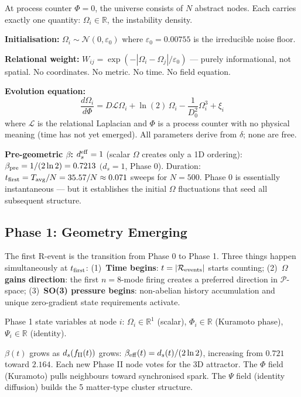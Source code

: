 \documentclass[12pt, a4paper]{article}
\begin{document}
\begin{formalbox}[title={Phase 0 --- Pre-Geometric State}]
At process counter $\Phi = 0$, the universe consists of $N$ abstract nodes. Each carries
exactly one quantity: $\Omega_i \in \mathbb{R}$, the instability density.

\textbf{Initialisation:} $\Omega_i \sim \mathcal{N}(0,\varepsilon_0)$ where
$\varepsilon_0 = 0.00755$ is the irreducible noise floor.

\textbf{Relational weight:} $W_{ij} = \exp(-|\Omega_i - \Omega_j|/\varepsilon_0)$ ---
purely informational, not spatial. No coordinates. No metric. No time. No field equation.

\textbf{Evolution equation:}
\[
  \frac{d\Omega_i}{d\Phi} = D\mathcal{L}\Omega_i + \ln(2)\,\Omega_i
  - \frac{1}{D_0^2}\Omega_i^3 + \xi_i
\]
where $\mathcal{L}$ is the relational Laplacian and $\Phi$ is a process counter
with no physical meaning (time has not yet emerged). All parameters derive from $\delta$;
none are free.

\textbf{Pre-geometric $\beta$:} $d_s^{\rm eff} = 1$ (scalar $\Omega$ creates only a 1D ordering):
$\beta_{\rm pre} = 1/(2\ln 2) = 0.7213$ $(d_s=1$, Phase 0).
Duration: $t_{\rm first} = T_{\rm avg}/N = 35.57/N \approx 0.071$ sweeps for $N=500$.
Phase 0 is essentially instantaneous --- but it establishes the initial $\Omega$ fluctuations
that seed all subsequent structure.
\end{formalbox}

\subsection{Phase 1: Geometry Emerging}

The first R-event is the transition from Phase 0 to Phase 1. Three things happen
simultaneously at $t_{\rm first}$: (1)~\textbf{Time begins}: $t = |\mathcal{R}_{\rm events}|$
starts counting; (2)~$\Omega$ \textbf{gains direction}: the first $n=8$-mode firing creates
a preferred direction in $\mathcal{P}$-space; (3)~\textbf{SO(3) pressure begins}: non-abelian
history accumulation and unique zero-gradient state requirements activate.

\begin{formalbox}[title={Phase 1 --- Geometry Emerging}]
Phase 1 state variables at node $i$: $\Omega_i\in\mathbb{R}^1$ (scalar),
$\Phi_i\in\mathbb{R}$ (Kuramoto phase), $\Psi_i\in\mathbb{R}$ (identity).

$\beta(t)$ grows as $d_s(f_{\rm II}(t))$ grows:
$\beta_{\rm eff}(t) = d_s(t)/(2\ln 2)$, increasing from $0.721$ toward $2.164$.
Each new Phase II node votes for the 3D attractor. The $\Phi$ field (Kuramoto)
pulls neighbours toward synchronised spark. The $\Psi$ field (identity diffusion)
builds the 5 matter-type cluster structure.
\end{formalbox}
\end{document}
